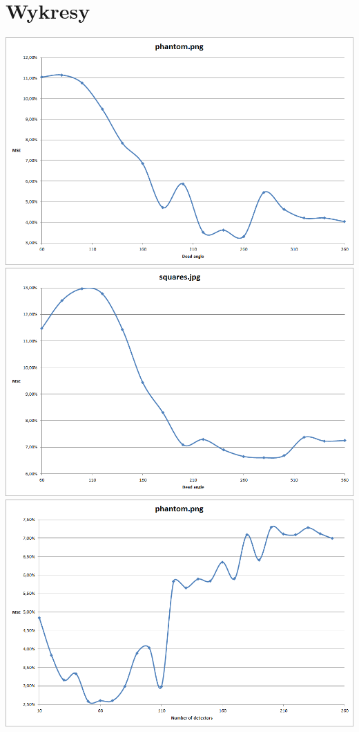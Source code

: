 \documentclass[a4paper,11pt]{article}
\begin{document}
\section{Wykresy}
\includegraphics[width=\textwidth]{phantomDeadAngle}
\includegraphics[width=\textwidth]{squaresDeadAngle}
\includegraphics[width=\textwidth]{phantomDetectors}
\end{document}
